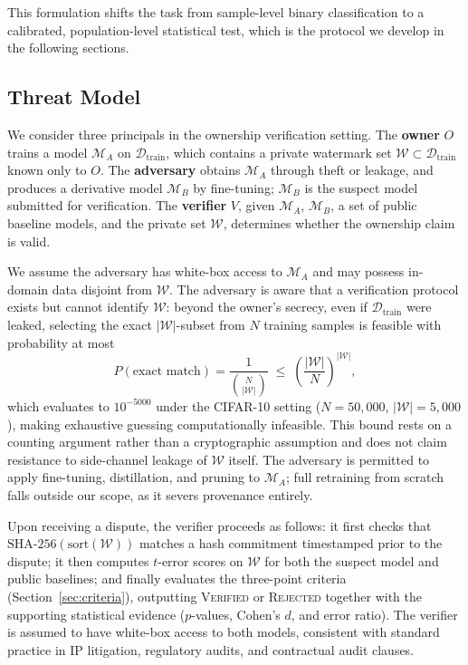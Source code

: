 \documentclass{article}
\begin{document}
This formulation shifts the task from sample-level binary 
classification to a calibrated, population-level statistical test, 
which is the protocol we develop in the following sections.

\subsection{Threat Model}

We consider three principals in the ownership verification setting.
The \textbf{owner} $O$ trains a model $\mathcal{M}_A$ on 
$\mathcal{D}_{\mathrm{train}}$, which contains a private watermark 
set $\mathcal{W} \subset \mathcal{D}_{\mathrm{train}}$ known only 
to $O$.
The \textbf{adversary} obtains $\mathcal{M}_A$ through theft or 
leakage, and produces a derivative model $\mathcal{M}_B$ by 
fine-tuning; $\mathcal{M}_B$ is the suspect model submitted for 
verification.
The \textbf{verifier} $V$, given $\mathcal{M}_A$, $\mathcal{M}_B$, 
a set of public baseline models, and the private set $\mathcal{W}$, 
determines whether the ownership claim is valid.

We assume the adversary has white-box access to $\mathcal{M}_A$ 
and may possess in-domain data disjoint from $\mathcal{W}$. The 
adversary is aware that a verification protocol exists but cannot 
identify $\mathcal{W}$: beyond the owner's secrecy, even if 
$\mathcal{D}_{\mathrm{train}}$ were leaked, selecting the exact 
$|\mathcal{W}|$-subset from $N$ training samples is feasible with probability 
at most
%
\begin{equation}
    P(\text{exact match}) 
    = \frac{1}{\binom{N}{|\mathcal{W}|}} 
    \;\leq\; \left(\frac{|\mathcal{W}|}{N}\right)^{|\mathcal{W}|},
\end{equation}
%
which evaluates to $10^{-5000}$ under the CIFAR-10 setting 
($N=50{,}000$, $|\mathcal{W}|=5{,}000$), making exhaustive guessing 
computationally infeasible. This bound rests on a counting 
argument rather than a cryptographic assumption and does not 
claim resistance to side-channel leakage of $\mathcal{W}$ itself. 
The adversary is permitted to apply fine-tuning, distillation, 
and pruning to $\mathcal{M}_A$; full retraining from scratch 
falls outside our scope, as it severs provenance entirely.

Upon receiving a dispute, the verifier proceeds as follows: 
it first checks that $\mathrm{SHA\text{-}256}(\mathrm{sort}
(\mathcal{W}))$ matches a hash commitment timestamped prior to 
the dispute; it then computes $t$-error scores on $\mathcal{W}$ 
for both the suspect model and public baselines; and finally 
evaluates the three-point criteria (Section~\ref{sec:criteria}), 
outputting \textsc{Verified} or \textsc{Rejected} together with 
the supporting statistical evidence ($p$-values, Cohen's $d$, 
and error ratio). The verifier is assumed to have white-box 
access to both models, consistent with standard practice in IP 
litigation, regulatory audits, and contractual audit clauses.
\end{document}
